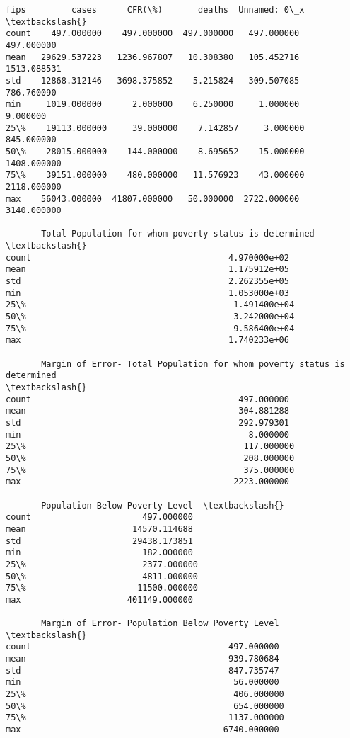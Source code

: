 \documentclass[11pt]{article}
\makeatletter
\newcommand{\boxspacing}{\kern\kvtcb@left@rule\kern\kvtcb@boxsep}
\newcommand{\prompt}[4]{
        \ttfamily\llap{{\color{#2}[#3]:\hspace{3pt}#4}}\vspace{-\baselineskip}
    }
\makeatother
\begin{document}
            \begin{tcolorbox}[breakable, size=fbox, boxrule=.5pt, pad at break*=1mm, opacityfill=0]
\prompt{Out}{outcolor}{55}{\boxspacing}
\begin{Verbatim}[commandchars=\\\{\}]
               fips         cases      CFR(\%)       deaths  Unnamed: 0\_x  \textbackslash{}
count    497.000000    497.000000  497.000000   497.000000    497.000000
mean   29629.537223   1236.967807   10.308380   105.452716   1513.088531
std    12868.312146   3698.375852    5.215824   309.507085    786.760090
min     1019.000000      2.000000    6.250000     1.000000      9.000000
25\%    19113.000000     39.000000    7.142857     3.000000    845.000000
50\%    28015.000000    144.000000    8.695652    15.000000   1408.000000
75\%    39151.000000    480.000000   11.576923    43.000000   2118.000000
max    56043.000000  41807.000000   50.000000  2722.000000   3140.000000

       Total Population for whom poverty status is determined  \textbackslash{}
count                                       4.970000e+02
mean                                        1.175912e+05
std                                         2.262355e+05
min                                         1.053000e+03
25\%                                         1.491400e+04
50\%                                         3.242000e+04
75\%                                         9.586400e+04
max                                         1.740233e+06

       Margin of Error- Total Population for whom poverty status is determined
\textbackslash{}
count                                         497.000000
mean                                          304.881288
std                                           292.979301
min                                             8.000000
25\%                                           117.000000
50\%                                           208.000000
75\%                                           375.000000
max                                          2223.000000

       Population Below Poverty Level  \textbackslash{}
count                      497.000000
mean                     14570.114688
std                      29438.173851
min                        182.000000
25\%                       2377.000000
50\%                       4811.000000
75\%                      11500.000000
max                     401149.000000

       Margin of Error- Population Below Poverty Level  \textbackslash{}
count                                       497.000000
mean                                        939.780684
std                                         847.735747
min                                          56.000000
25\%                                         406.000000
50\%                                         654.000000
75\%                                        1137.000000
max                                        6740.000000


\end{Verbatim}
\end{tcolorbox}
\end{document}
